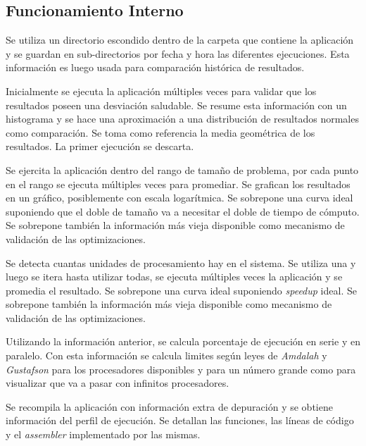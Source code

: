 \documentclass[a4paper]{report}
\begin{document}
\subsection{Funcionamiento Interno}

Se utiliza un directorio escondido dentro de la carpeta que contiene la aplicación y se guardan en sub-directorios por fecha y hora las diferentes ejecuciones. Esta información es luego usada para comparación histórica de resultados.

\bigskip

Inicialmente se ejecuta la aplicación múltiples veces para validar que los resultados poseen una desviación saludable. Se resume esta información con un histograma y se hace una aproximación a una distribución de resultados normales como comparación.
Se toma como referencia la media geométrica de los resultados.
La primer ejecución se descarta.

\bigskip

Se ejercita la aplicación dentro del rango de tamaño de problema, por cada punto en el rango se ejecuta múltiples veces para promediar. Se grafican los resultados en un gráfico, posiblemente con escala logarítmica. Se sobrepone una curva ideal suponiendo que el doble de tamaño va a necesitar el doble de tiempo de cómputo.
Se sobrepone también la información más vieja disponible como mecanismo de validación de las optimizaciones.

\bigskip

Se detecta cuantas unidades de procesamiento hay en el sistema. Se utiliza una y luego se itera hasta utilizar todas, se ejecuta múltiples veces la aplicación y se promedia el resultado. Se sobrepone una curva ideal suponiendo {\it speedup} ideal. Se sobrepone también la información más vieja disponible como mecanismo de validación de las optimizaciones.

\bigskip

Utilizando la información anterior, se calcula porcentaje de ejecución en serie y en paralelo. Con esta información se calcula limites según leyes de {\it Amdalah} y {\it Gustafson} para los procesadores disponibles y para un número grande como para visualizar que va a pasar con infinitos procesadores.

\bigskip

Se recompila la aplicación con información extra de depuración y se obtiene información del perfil de ejecución. Se detallan las funciones, las líneas de código y el {\it assembler} implementado por las mismas.
\end{document}
